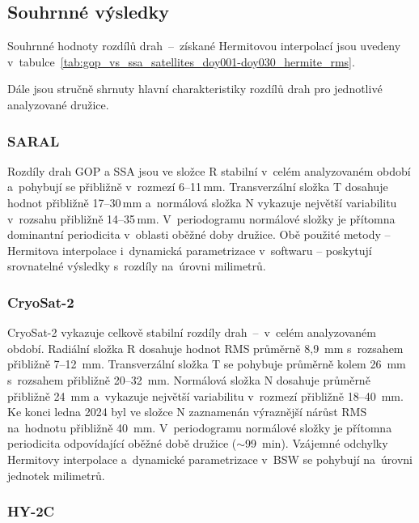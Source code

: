 \subsection{Souhrnné výsledky}
\label{sec:souhrn-drahy}

Souhrnné hodnoty  rozdílů drah \,--\, získané Hermitovou interpolací jsou uvedeny v~tabulce~\ref{tab:gop_vs_ssa_satellites_doy001-doy030_hermite_rms}.


Dále jsou stručně shrnuty hlavní charakteristiky rozdílů drah pro jednotlivé analyzované družice.

\subsubsection{SARAL}

Rozdíly drah GOP a SSA jsou ve složce R stabilní v~celém analyzovaném období a~pohybují se přibližně v~rozmezí 6--11\,mm. Transverzální složka T dosahuje hodnot přibližně 17--30\,mm a~normálová složka N vykazuje největší variabilitu v~rozsahu přibližně 14--35\,mm. V~periodogramu normálové složky je přítomna dominantní periodicita v~oblasti oběžné doby družice. Obě použité metody -- Hermitova interpolace i~dynamická parametrizace v~softwaru  -- poskytují srovnatelné výsledky s~rozdíly na~úrovni milimetrů.

\subsubsection{CryoSat-2}

CryoSat-2 vykazuje celkově stabilní rozdíly drah \,--\, v~celém analyzovaném období. Radiální složka R dosahuje hodnot RMS průměrně 8{,}9~mm s~rozsahem přibližně 7--12~mm. Transverzální složka T se pohybuje průměrně kolem 26~mm s~rozsahem přibližně 20--32~mm. Normálová složka N dosahuje průměrně přibližně 24~mm a~vykazuje největší variabilitu v~rozmezí přibližně 18--40~mm. Ke konci ledna 2024 byl ve složce N zaznamenán výraznější nárůst RMS na~hodnotu přibližně 40~mm. V~periodogramu normálové složky je přítomna periodicita odpovídající oběžné době družice ($\sim$99~min). Vzájemné odchylky Hermitovy interpolace a~dynamické parametrizace v~BSW se pohybují na~úrovni jednotek milimetrů.

\subsubsection{HY-2C}


